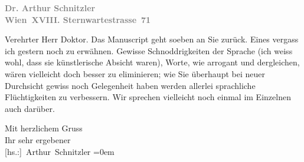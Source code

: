 \pstart
           \textcolor{gray}{\textbf{Dr. Arthur Schnitzler}}{\\}\textcolor{gray}{\textbf{Wien XVIII. Sternwartestrasse 71}}\pend
           
\pstart\center{}Verehrter Herr Doktor.\pend\vspace{0.5em}
\pstart
           Das Manuscript geht soeben an
               Sie zurück. Eines vergass ich gestern noch zu erwähnen. Gewisse Schnoddrigkeiten der
               Sprache (ich weiss wohl, dass sie künstlerische Absicht waren), Worte, wie arrogant
               und dergleichen, wären vielleicht doch besser zu eliminieren; wie Sie überhaupt bei
               neuer Durchsicht gewiss noch Gelegenheit haben werden allerlei sprachliche
               Flüchtigkeiten zu verbessern. Wir sprechen vielleicht noch einmal im Einzelnen auch
               darüber.\pend
           
\pstart
           Mit herzlichem Gruss{\\[\baselineskip]}Ihr sehr ergebener{\\[\baselineskip]}\spacefill\mbox{{[}hs.:{]} Arthur Schnitzler}\pend
           \leftskip=0em{}\endnumbering{}  \newcommand{\dateiname}{L02278}\newcommand{\titel}{Arthur Schnitzler an Robert Adam, 2[6]. 10. 1917}\newcommand{\editorInnen}{Martin Anton Müller und Gerd-Hermann Susen}
